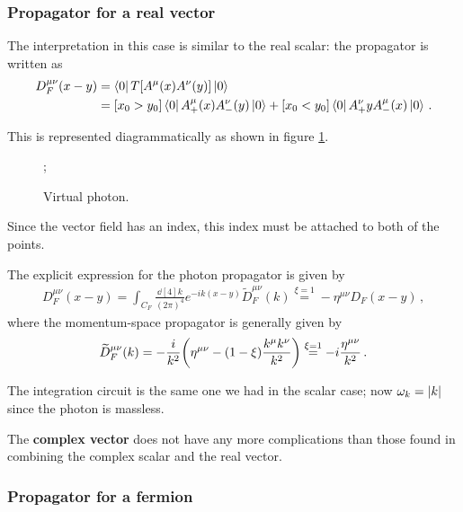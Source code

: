 \documentclass[main.tex]{subfiles}
\begin{document}
\subsubsection{Propagator for a real vector}

The interpretation in this case is similar to the real scalar: the propagator is written as 
%
\begin{subequations}
\begin{align}
D^{\mu \nu }_{F} (x-y) &= \bra{0} T[A^{\mu }(x) A^{\nu }(y)] \ket{0}  \\
&= [x_0 > y_0 ] \bra{0} A^{\mu }_{+}(x) A^{\nu }_{-}(y) \ket{0}
+ [x_0 < y_0 ] \bra{0} A^{\nu }_{+} y A^{\mu }_{-}(x) \ket{0} 
\,.
\end{align}
\end{subequations}

This is represented diagrammatically as shown in figure \ref{fig:virtual-photon-diagram}.

\begin{figure}[ht]
\centering
{};
\caption{Virtual photon.}
\label{fig:virtual-photon-diagram}
\end{figure}

Since the vector field has an index, this index must be attached to both of the points. 

The explicit expression for the photon propagator is given by 
%
\begin{align}
D^{\mu \nu }_{F} (x-y) = \int_{C_F} \frac{ \dd[4]{k}}{(2 \pi )^{4}}
e^{-ik(x-y)} \widetilde{D}^{\mu \nu }_{F} (k) \overset{\xi = 1}{=} - \eta^{\mu \nu } D_F (x-y)
\,,
\end{align}
%
where the momentum-space propagator is generally given by
%
\begin{align}
\widetilde{D}^{\mu \nu }_{F} (k) = - \frac{i}{k^2} \qty(\eta^{ \mu \nu } - (1 - \xi ) \frac{k^{\mu }k^{\nu }}{k^2}) 
\overset{\xi = 1}{=}
- i \frac{\eta^{\mu \nu }}{k^2}
\,.
\end{align}

The integration circuit is the same one we had in the scalar case; now \(\omega_{k} = \abs{k}\) since the photon is massless.

The \textbf{complex vector} does not have any more complications than those found in combining the complex scalar and the real vector.

\subsubsection{Propagator for a fermion}
\end{document}
